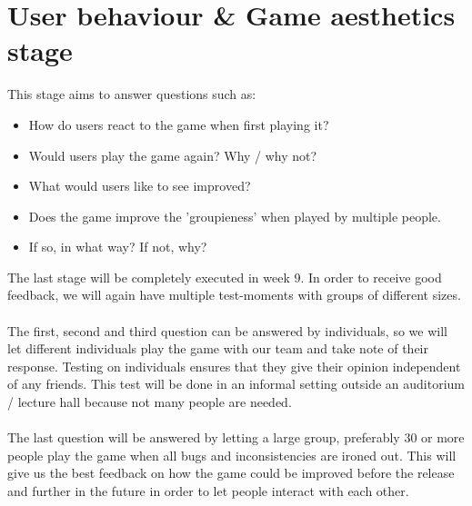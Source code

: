 \documentclass[11pt,a4paper]{article}
\begin{document}
\section{User behaviour \& Game aesthetics stage}
This stage aims to answer questions such as:
\begin{itemize}
\item How do users react to the game when first playing it?
\item Would users play the game again? Why / why not?
\item What would users like to see improved?
\item Does the game improve the 'groupieness' when played by multiple people.
\item If so, in what way? If not, why?
\end{itemize}
The last stage will be completely executed in week 9. In order to receive good feedback, we will again have multiple test-moments with groups of different sizes.\\
\\
The first, second and third question can be answered by individuals, so we will let different individuals play the game with our team and take note of their response. Testing on individuals ensures that they give their opinion independent of any friends. This test will be done in an informal setting outside an auditorium / lecture hall because not many people are needed.\\
\\
The last question will be answered by letting a large group, preferably 30 or more people play the game when all bugs and inconsistencies are ironed out. This will give us the best feedback on how the game could be improved before the release and further in the future in order to let people interact with each other.
\end{document}
